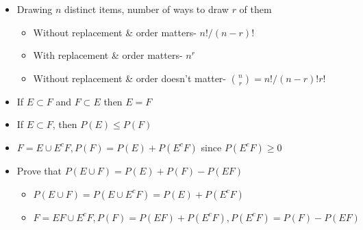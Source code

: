 \documentclass[10pt]{article}
\begin{document}
\begin{itemize}
	\item Drawing $n$ distinct items, number of ways to draw $r$ of them
		\begin{itemize}
			\item Without replacement \& order matters- $n!/(n-r)!$
			\item With replacement \& order matters- $n^r$
			\item Without replacement \& order doesn't matter- ${n \choose r} = n!/(n-r)!r!$ \\
		\end{itemize}
	\item If $E \subset F$ and $F \subset E$ then $E=F$
	\item If $E \subset F$, then $P(E) \leq P(F)$
	\item $F = E \cup E^cF, P(F) = P(E) + P(E^cF) $ since $ P(E^cF) \geq 0$ \\
	\item Prove that $P(E \cup F) = P(E) + P(F) - P(EF)$
		\begin{itemize}
			\item $P(E \cup F) = P(E \cup E^cF) = P(E) + P(E^cF)$
			\item $F = EF \cup E^cF, P(F) = P(EF) + P(E^cF), P(E^cF) = P(F) - P(EF)$
		\end{itemize}
\end{itemize}
\end{document}
